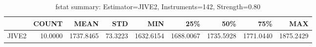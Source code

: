 \begin{table}[ht]
\centering
\caption{fstat summary: Estimator=JIVE2, Instruments=142, Strength=0.80}
\begin{tabular}{lrrrrrrrr}
\toprule
 & COUNT & MEAN & STD & MIN & 25\% & 50\% & 75\% & MAX \\
\midrule
JIVE2 & 10.0000 & 1737.8465 & 73.3223 & 1632.6154 & 1688.0067 & 1735.5928 & 1771.0440 & 1875.2429 \\
\bottomrule
\end{tabular}
\end{table}
